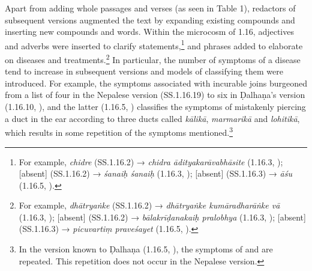 Apart from adding whole passages and verses (as seen in Table 1), redactors of subsequent versions augmented the text by expanding existing compounds and inserting new compounds and words. Within the microcosm of 1.16, adjectives and adverbs were inserted to clarify statements,\footnote{For example, \emph{chidre} (SS.1.16.2) → \emph{chidra ādityakarāvabhāsite} (1.16.3, \cite[76]{vulgate}); [absent] (SS.1.16.2) → \emph{śanaiḥ śanaiḥ} (1.16.3, \cite[76]{vulgate});  [absent] (SS.1.16.3) → \emph{āśu} (1.16.5, \cite[77]{vulgate}).} and phrases added to elaborate on diseases and treatments.\footnote{For example, \emph{dhātryaṅke} (SS.1.16.2) → \emph{dhātryaṅke kumāradharāṅke vā} (1.16.3, \cite[76]{vulgate}); [absent] (SS.1.16.2) → \emph{bālakrīḍanakaiḥ pralobhya} (1.16.3, \cite[76]{vulgate});  [absent] (SS.1.16.3) → \emph{picuvartiṃ praveśayet} (1.16.5, \cite[77]{vulgate}).} In particular, the number of symptoms of a disease tend to increase in subsequent versions and models of classifying them were introduced. For example, the symptoms associated with incurable joins burgeoned from a list of four in the Nepalese version (SS.1.16.19) to six in Ḍalhaṇa's version (1.16.10, \cite[77]{vulgate}), and the latter (1.16.5, \cite[76–77]{vulgate}) classifies the symptoms of mistakenly piercing a duct in the ear according to three ducts called \emph{kālikā}, \emph{marmarikā} and \emph{lohitikā}, which results in some repetition of the symptoms mentioned.\footnote{In the version known to Ḍalhaṇa  (1.16.5, \cite[76–77]{vulgate}), the symptoms of  and  are repeated. This repetition does not occur in the Nepalese version.}

